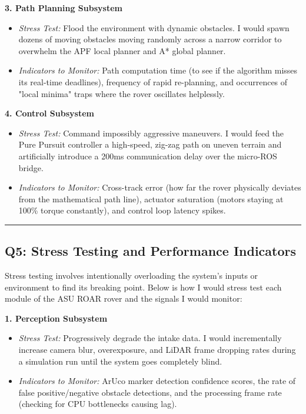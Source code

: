 \documentclass[12pt,a4paper]{article}
\begin{document}
\noindent\textbf{3. Path Planning Subsystem}
\begin{itemize}[leftmargin=*]
    \item \textit{Stress Test:} Flood the environment with dynamic obstacles. I would spawn dozens of moving obstacles moving randomly across a narrow corridor to overwhelm the APF local planner and A* global planner.
    \item \textit{Indicators to Monitor:} Path computation time (to see if the algorithm misses its real-time deadlines), frequency of rapid re-planning, and occurrences of "local minima" traps where the rover oscillates helplessly.
\end{itemize}

\noindent\textbf{4. Control Subsystem}
\begin{itemize}[leftmargin=*]
    \item \textit{Stress Test:} Command impossibly aggressive maneuvers. I would feed the Pure Pursuit controller a high-speed, zig-zag path on uneven terrain and artificially introduce a 200ms communication delay over the micro-ROS bridge.
    \item \textit{Indicators to Monitor:} Cross-track error (how far the rover physically deviates from the mathematical path line), actuator saturation (motors staying at 100\% torque constantly), and control loop latency spikes.
\end{itemize}

\vspace{0.3em}
\noindent\rule{\textwidth}{0.4pt}
\vspace{0.3em}




\subsection{Q5: Stress Testing and Performance Indicators}

Stress testing involves intentionally overloading the system's inputs or environment to find its breaking point. Below is how I would stress test each module of the ASU ROAR rover and the signals I would monitor:

\noindent\textbf{1. Perception Subsystem}
\begin{itemize}[leftmargin=*]
    \item \textit{Stress Test:} Progressively degrade the intake data. I would incrementally increase camera blur, overexposure, and LiDAR frame dropping rates during a simulation run until the system goes completely blind.
    \item \textit{Indicators to Monitor:} ArUco marker detection confidence scores, the rate of false positive/negative obstacle detections, and the processing frame rate (checking for CPU bottlenecks causing lag).
\end{itemize}
\end{document}
